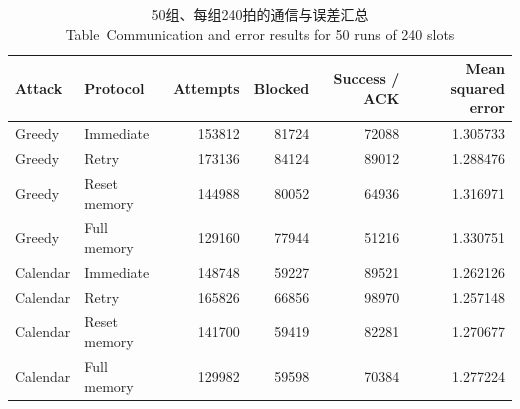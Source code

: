 \begin{table}[htbp]
\centering\small
\caption{50组、每组240拍的通信与误差汇总\\ Table~\thetable\quad Communication and error results for 50 runs of 240 slots}\label{tab:results}
\begin{tabular}{llrrrr}
\toprule
Attack & Protocol & Attempts & Blocked & Success / ACK & Mean squared error\\
\midrule
Greedy & Immediate & 153812 & 81724 & 72088 & 1.305733 \\
Greedy & Retry & 173136 & 84124 & 89012 & 1.288476 \\
Greedy & Reset memory & 144988 & 80052 & 64936 & 1.316971 \\
Greedy & Full memory & 129160 & 77944 & 51216 & 1.330751 \\
\midrule
Calendar & Immediate & 148748 & 59227 & 89521 & 1.262126 \\
Calendar & Retry & 165826 & 66856 & 98970 & 1.257148 \\
Calendar & Reset memory & 141700 & 59419 & 82281 & 1.270677 \\
Calendar & Full memory & 129982 & 59598 & 70384 & 1.277224 \\
\bottomrule
\end{tabular}
\end{table}
